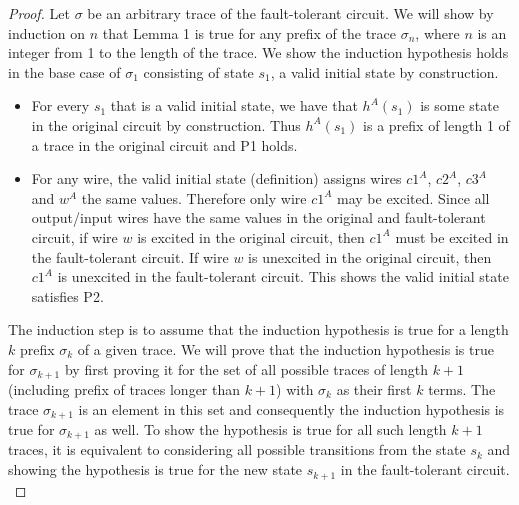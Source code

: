 \documentclass[12pt]{report}
\begin{document}
\begin{proof}
Let $\sigma$ be an arbitrary trace of the fault-tolerant circuit.  We will show by induction on $n$ that Lemma 1 is true for any prefix of the trace $\sigma_n$, where $n$ is an integer from 1 to the length of the trace.  
We show the induction hypothesis holds in the base case of $\sigma_1$ consisting of state $s_1$, a valid initial state by construction.
\begin{itemize}
\item For every $s_1$ that is a valid initial state, we have that $h^A(s_1)$ is some state in the original circuit by construction. %
 Thus $h^A(s_1)$ is a prefix of length 1 of a trace in the original circuit and P1 holds.
\item 
For any wire, the valid initial state (definition) assigns wires $c1^A$, $c2^A$, $c3^A$ and $w^A$ the same values.  Therefore only wire $c1^A$ may be excited. Since all output/input wires have the same values in the original and fault-tolerant circuit, if wire $w$ is excited in the original circuit, then $c1^A$ must be excited in the fault-tolerant circuit.  %
If wire $w$ is unexcited in the original circuit, then $c1^A$ is unexcited in the fault-tolerant circuit.  This shows the valid initial state satisfies P2.    %
\end{itemize}

The induction step is to assume that the induction hypothesis is true for a length $k$ prefix $\sigma_k$ of a given trace.  We will prove that the induction hypothesis is true for $\sigma_{k+1}$ by first proving it for the set of all possible traces of length $k+1$ (including prefix of traces longer than $k+1$) with $\sigma_k$ as their first $k$ terms.  %
The trace $\sigma_{k+1}$ is an element in this set and consequently the induction hypothesis is true for $\sigma_{k+1}$ as well.  
To show the hypothesis is true for all such length $k+1$ traces, it is equivalent to considering all possible transitions from the state $s_k$ and showing the hypothesis is true for the new state $s_{k+1}$ in the fault-tolerant circuit.\\


\end{proof}
\end{document}

